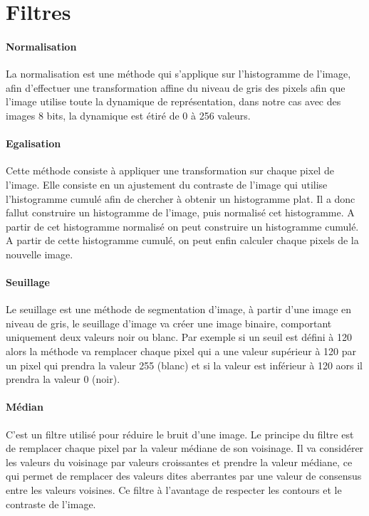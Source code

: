 \section{Filtres}
	
	\paragraph{Normalisation}
	\label{Normalisation}
	La normalisation est une méthode qui s'applique sur l'histogramme de l'image, afin d'effectuer une transformation affine du niveau de gris des pixels afin que l'image utilise toute la dynamique de représentation, dans notre cas avec des images 8 bits, la dynamique est étiré de 0 à 256 valeurs.


	\paragraph{Egalisation}

	\label{Egalisation}
	Cette méthode consiste à appliquer une transformation sur chaque pixel de l'image. Elle consiste en un ajustement du contraste de l'image qui utilise l'histogramme cumulé afin de chercher à obtenir un histogramme plat. Il a donc fallut construire un histogramme de l'image, puis normalisé cet histogramme. A partir de cet histogramme normalisé on peut construire un histogramme cumulé. A partir de cette histogramme cumulé, on peut enfin calculer chaque pixels de la nouvelle image.

	
	\paragraph{Seuillage}
	\label{Seuillage}

	Le seuillage est une méthode de segmentation d'image, à partir d'une image en niveau de gris, le seuillage d'image va créer une image binaire, comportant uniquement deux valeurs noir ou blanc. Par exemple si un seuil est défini à 120 alors la méthode va remplacer chaque pixel qui a une valeur supérieur à 120 par un pixel qui prendra la valeur 255  (blanc) et si la valeur est inférieur à 120 aors il prendra la valeur 0 (noir).

	\paragraph{Médian}
	\label{Médian}

	C'est un filtre utilisé pour réduire le bruit d'une image. Le principe du filtre est de remplacer chaque pixel par la valeur médiane de son voisinage. Il va considérer les valeurs du voisinage par valeurs croissantes et prendre la valeur médiane, ce qui permet de remplacer des valeurs dites aberrantes par une valeur de consensus entre les valeurs voisines. Ce filtre à l'avantage de respecter les contours et le contraste de l'image.

